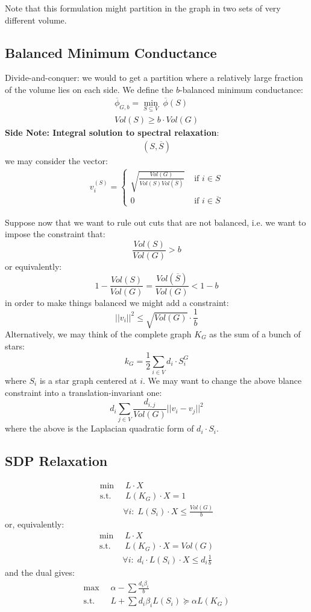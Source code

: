 \documentclass[11pt]{article}
\begin{document}
Note that this formulation might partition in the graph in two sets of very different volume.
\subsection*{Balanced Minimum Conductance}
Divide-and-conquer: we would to get a partition where a relatively large fraction of the volume lies on each side. We define the $b$-balanced minimum conductance:
\begin{align*}
    \overline{\phi}_{G,b} = \underset{S \subseteq V}{\min}\; \overline{\phi}(S)\\
    Vol(S) \geq b\cdot Vol(G)
\end{align*}
\textbf{Side Note: Integral solution to spectral relaxation}:
\begin{align*}
    (S,\overline{S})
\end{align*}
we may consider the vector:
\begin{align*}
    v_{i}^{(S)} = \begin{cases} \sqrt{\frac{Vol(G)}{Vol(S)Vol(\overline{S})}} & \text{ if } i \in S\\
    0 & \text{ if }  i \in \overline{S}
    \end{cases}
\end{align*}

Suppose now that we want to rule out cuts that are not balanced, i.e. we want to impose the constraint that:
\[
    \frac{Vol(S)}{Vol(G)} > b    
\]
or equivalently:
\[
    1- \frac{Vol(S)}{Vol(G)} = \frac{Vol(\overline{S})}{Vol(G)} < 1-b
\]
in order to make things balanced we might add a constraint:
\[
    ||v_i||^2 \leq \sqrt{Vol(G)} \cdot \frac{1}{b}
\]
Alternatively, we may think of the complete graph $K_G$ as the sum of a bunch of stars:
\[
    k_G = \frac{1}{2}\sum_{i \in V} d_i \cdot S_i^G
\]
where $S_i$ is a star graph centered at $i$. We may want to change the above blance constraint into a translation-invariant one:
\[
    d_{i}\sum_{j \in V}\frac{d_{i,j}}{Vol(G)}||v_i - v_j||^2
\]
where the above is the Laplacian quadratic form of $d_i\cdot S_i$.
\subsection*{SDP Relaxation}
\begin{align*}
    \min \;&\; L \cdot X\\
    \text{s.t.}\;&\;L(K_G) \cdot X = 1\\
    &\forall i: \; L(S_i)\cdot X \leq  \frac{Vol(G)}{b}
\end{align*}
or, equivalently:
\begin{align*}
    \min \;&\; L \cdot X\\
    \text{s.t.}\;&\;L(K_G) \cdot X = Vol(G)\\
    &\forall i: \; d_i\cdot L(S_i)\cdot X \leq  d_i \frac{1}{b}
\end{align*}
and the dual gives:
\begin{align*}
    \max \;&\; \alpha - \sum \frac{d_i\beta_i }{b}\\
    \text{s.t.}\;&\; L + \sum d_i \beta_i L(S_i) \succeq \alpha L(K_G)
\end{align*}
\end{document}
